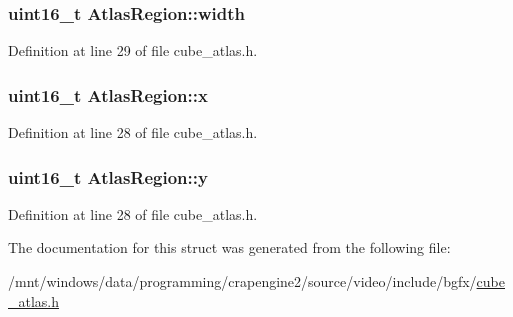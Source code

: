 \hypertarget{struct_atlas_region_afa487dd2e5e49d4e873d505b8b3d413e}{
\subsubsection[{width}]{\setlength{\rightskip}{0pt plus 5cm}uint16\+\_\+t Atlas\+Region\+::width}}\label{struct_atlas_region_afa487dd2e5e49d4e873d505b8b3d413e}


Definition at line 29 of file cube\+\_\+atlas.\+h.

\hypertarget{struct_atlas_region_aee785d751de233eac49a4bb9ea27bd70}{
\subsubsection[{x}]{\setlength{\rightskip}{0pt plus 5cm}uint16\+\_\+t Atlas\+Region\+::x}}\label{struct_atlas_region_aee785d751de233eac49a4bb9ea27bd70}


Definition at line 28 of file cube\+\_\+atlas.\+h.

\hypertarget{struct_atlas_region_a27b91687289b01babe0625c869d216b3}{
\subsubsection[{y}]{\setlength{\rightskip}{0pt plus 5cm}uint16\+\_\+t Atlas\+Region\+::y}}\label{struct_atlas_region_a27b91687289b01babe0625c869d216b3}


Definition at line 28 of file cube\+\_\+atlas.\+h.



The documentation for this struct was generated from the following file\+:\begin{DoxyCompactItemize}
\item 
/mnt/windows/data/programming/crapengine2/source/video/include/bgfx/\hyperlink{cube__atlas_8h}{cube\+\_\+atlas.\+h}\end{DoxyCompactItemize}
